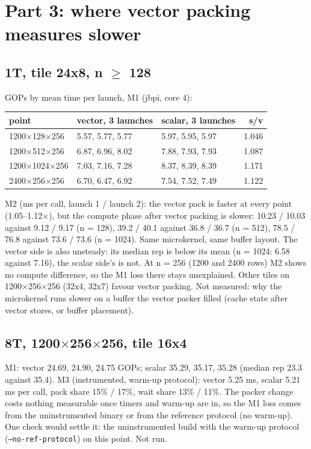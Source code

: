 \documentclass[10pt,a4paper]{article}
\begin{document}
\section*{Part 3: where vector packing measures slower}
\subsection*{1T, tile 24x8, n $\ge$ 128}
GOPs by mean time per launch, M1 (jbpi, core 4):

\begin{tabular}{@{}l l l r@{}}
\toprule
point & vector, 3 launches & scalar, 3 launches & s/v \\
\midrule
1200$\times$128$\times$256 & 5.57, 5.77, 5.77 & 5.97, 5.95, 5.97 & 1.046 \\
1200$\times$512$\times$256 & 6.87, 6.96, 8.02 & 7.88, 7.93, 7.93 & 1.087 \\
1200$\times$1024$\times$256 & 7.03, 7.16, 7.28 & 8.37, 8.39, 8.39 & 1.171 \\
2400$\times$256$\times$256 & 6.70, 6.47, 6.92 & 7.54, 7.52, 7.49 & 1.122 \\
\bottomrule
\end{tabular}

\medskip\noindent M2 (ms per call, launch 1 / launch 2): the vector pack is faster at every point (1.05--1.12$\times$),
but the compute phase after vector packing is slower: 10.23 / 10.03 against 9.12 / 9.17 (n = 128), 39.2 / 40.1 against
36.8 / 36.7 (n = 512), 78.5 / 76.8 against 73.6 / 73.6 (n = 1024). Same microkernel, same buffer layout. The vector side
is also unsteady: its median rep is below its mean (n = 1024: 6.58 against 7.16), the scalar side's is not. At n = 256 (1200 and 2400 rows) M2 shows no compute
difference, so the M1 loss there stays unexplained. Other tiles on 1200$\times$256$\times$256 (32x4, 32x7) favour vector packing. Not measured: why the microkernel runs slower on a
buffer the vector packer filled (cache state after vector stores, or buffer placement).

\subsection*{8T, 1200$\times$256$\times$256, tile 16x4}
M1: vector 24.69, 24.90, 24.75 GOPs; scalar 35.29, 35.17, 35.28 (median rep 23.3 against 35.4). M3 (instrumented,
warm-up protocol): vector 5.25 ms, scalar 5.21 ms per call, pack share 15\% / 17\%, wait share 13\% / 11\%. The packer
change costs nothing measurable once timers and warm-up are in, so the M1 loss comes from the uninstrumented binary or
from the reference protocol (no warm-up). One check would settle it: the uninstrumented build with the warm-up protocol
(\texttt{--no-ref-protocol}) on this point. Not run.
\end{document}
